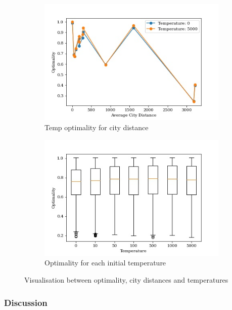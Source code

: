 \documentclass{article}
\begin{document}
\begin{figure}[H]
\centering
    \begin{subfigure}{0.45\textwidth}
        \centering
        \includegraphics[width=1\linewidth]{images/tsplib_optimality_city_dist.jpg}
        \caption{Temp optimality for city distance}
        \label{fig:sub1}
    \end{subfigure}%
    \begin{subfigure}{0.45\textwidth}
        \centering  
        \includegraphics[width=1\linewidth]{images/tsplib_optimality_temperature.jpg}
        \caption{Optimality for each initial temperature}
        \label{fig:sub2}
    \end{subfigure}
    \caption{Visualisation between optimality, city distances and temperatures}
\end{figure}

\subsubsection{Discussion}
\end{document}
